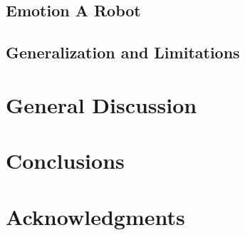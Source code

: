 \documentclass{sig-alternate-05-2015}
\begin{document}
\subsection{Emotion A Robot}

\subsection{Generalization and Limitations}




\section{General Discussion}




\section{Conclusions}


\section{Acknowledgments}

%

%
%
\end{document}
